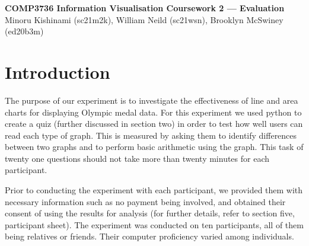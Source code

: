 
\begin{flushleft}
    \textbf{\large COMP3736 Information Visualisation Coursework 2 --- Evaluation}\\
    Minoru Kishinami (sc21m2k), William Neild (sc21wsn), Brooklyn McSwiney (ed20b3m)\\
\end{flushleft}
\section{Introduction}

\begin{flushleft}
    \quad The purpose of our experiment is to investigate the effectiveness of line and area charts for displaying Olympic medal data.
    For this experiment we used python to create a quiz (further discussed in section two) in order to test how well users can read
    each type of graph. This is measured by asking them to identify differences between two graphs and to perform basic arithmetic
    using the graph. This task of twenty one questions should not take more than twenty minutes for each participant.
    
    \quad Prior to conducting the experiment with each participant, we provided them with necessary information such as no payment being involved, and obtained their consent of using the results for analysis (for further details, refer to section five, participant sheet). The experiment was conducted on ten participants, all of them being relatives or friends. Their computer proficiency varied among individuals. 
\end{flushleft}


